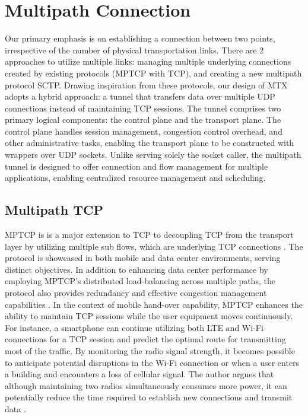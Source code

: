 \section{Multipath Connection}\label{sec:related_work:mp_connection}
Our primary emphasis is on establishing a connection between two points, irrespective of the number of physical transportation links.
There are 2 approaches to utilize multiple links: managing multiple underlying connections created by existing protocols (\ac{MPTCP} with TCP), and creating a new multipath protocol \ac{SCTP}.
Drawing inspiration from these protocols, our design of \ac{MTX} adopts a hybrid approach: a tunnel that transfers data over multiple UDP connections instead of maintaining TCP sessions. 
The tunnel comprises two primary logical components: the control plane and the transport plane. 
The control plane handles session management, congestion control overhead, and other administrative tasks, enabling the transport plane to be constructed with wrappers over UDP sockets.
Unlike serving solely the socket caller, the multipath tunnel is designed to offer connection and flow management for multiple applications, enabling centralized resource management and scheduling.

\subsection{Multipath TCP}\label{sec:related_work:mp_connection:MPTCP}

\ac{MPTCP} is is a major extension to TCP to decoupling TCP from the transport layer by utilizing multiple sub flows, which are underlying TCP connections \cite{Bonaventure_mptcp_decoupling}.
The protocol is showcased in both mobile and data center environments, serving distinct objectives. 
In addition to enhancing data center performance by employing \ac{MPTCP}'s distributed load-balancing across multiple paths, the protocol also provides redundancy and effective congestion management capabilities \cite{raiciu_improving_nodate}.
In the context of mobile hand-over capability, \ac{MPTCP} enhances the ability to maintain TCP sessions while the user equipment moves continuously. 
For instance, a smartphone can continue utilizing both LTE and Wi-Fi connections for a TCP session and predict the optimal route for transmitting most of the traffic. 
By monitoring the radio signal strength, it becomes possible to anticipate potential disruptions in the Wi-Fi connection or when a user enters a building and encounters a loss of cellular signal. 
The author argues that although maintaining two radios simultaneously consumes more power, it can potentially reduce the time required to establish new connections and transmit data \cite{paasch_multipath_2014}.

